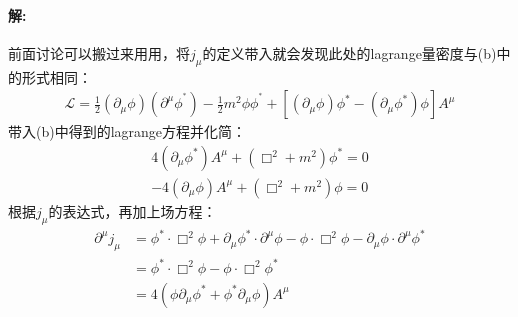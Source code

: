 \documentclass[a4paper]{ctexart}
\begin{document}
    \paragraph{解:}
    前面讨论可以搬过来用用，将$j_{\mu}$的定义带入就会发现此处的lagrange量密度与(b)中的形式相同：
    \begin{align}
        \mathcal{L} = \frac{1}{2}(\partial_{\mu}\phi)(\partial^{\mu}\phi^{^{\ast}}) - \frac{1}{2}m^{2}\phi\phi^{^{\ast}} + \left[(\partial_{\mu}\phi)\phi^{\ast} - (\partial_{\mu}\phi^{\ast})\phi\right]A^{\mu}
    \end{align}
    带入(b)中得到的lagrange方程并化简：
    \begin{align}
        4(\partial_{\mu}\phi^{\ast})A^{\mu} + (\Box^{2} + m^{2})\phi^{\ast} = 0\\
        -4(\partial_{\mu}\phi)A^{\mu} + (\Box^{2} + m^{2})\phi = 0
    \end{align}
    根据$j_{\mu}$的表达式，再加上场方程：
    \begin{align}
        \partial^{\mu}j_{\mu} &= \phi^{\ast}\cdot\Box^{2}\phi + \partial_{\mu}\phi^{\ast}\cdot\partial^{\mu}\phi -
        \phi\cdot\Box^{2}\phi - \partial_{\mu}\phi\cdot\partial^{\mu}\phi^{\ast}\\
        &= \phi^{\ast}\cdot\Box^{2}\phi - \phi\cdot\Box^{2}\phi^{\ast}\\
        &= 4(\phi\partial_{\mu}\phi^{\ast} + \phi^{\ast}\partial_{\mu}\phi)A^{\mu}
    \end{align}
\end{document}
